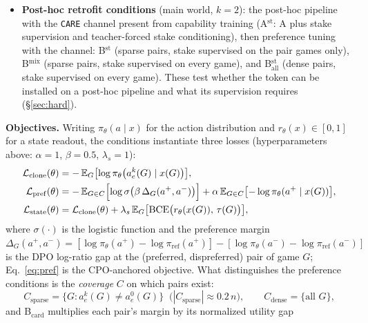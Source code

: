 \documentclass[11pt]{article}
\newcommand{\care}{\texttt{CARE}}
\begin{document}
\begin{itemize}
  $k \in \{0, .5, 1, 2, 4\}$ with normalized $k$ as an input feature (\S\ref{sec:dialruntime}).
\item \textbf{Post-hoc retrofit conditions} (main world, $k{=}2$): the post-hoc
  pipeline with the \care{} channel present from capability training
  (A$^{\mathrm{st}}$: A plus stake supervision and teacher-forced stake
  conditioning), then preference tuning with the channel: B$^{\mathrm{st}}$
  (sparse pairs, stake supervised on the pair games only), B$^{\mathrm{mix}}$
  (sparse pairs, stake supervised on every game), and
  B$_{\mathrm{all}}^{\mathrm{st}}$ (dense pairs, stake supervised on every
  game). These test whether the token can be installed on a post-hoc pipeline
  and what its supervision requires (\S\ref{sec:hard}).
\end{itemize}
\textbf{Objectives.} Writing $\pi_\theta(a \mid x)$ for the action distribution and
$r_\theta(x) \in [0,1]$ for a state readout, the conditions instantiate three losses
(hyperparameters above: $\alpha{=}1$, $\beta{=}0.5$, $\lambda_s{=}1$):
\begin{align}
\mathcal{L}_{\mathrm{clone}}(\theta) &=
-\,\mathbb{E}_{G}\bigl[\log \pi_\theta\bigl(a^{k}_{e}(G) \mid x(G)\bigr)\bigr],
\label{eq:clone}\\
\mathcal{L}_{\mathrm{pref}}(\theta) &=
-\,\mathbb{E}_{G \in C}\Bigl[\log \sigma\bigl(\beta\,\Delta_{G}(a^{+}, a^{-})\bigr)\Bigr]
+ \alpha\, \mathbb{E}_{G \in C}\bigl[-\log \pi_\theta(a^{+} \mid x(G))\bigr],
\label{eq:pref}\\
\mathcal{L}_{\mathrm{state}}(\theta) &=
\mathcal{L}_{\mathrm{clone}}(\theta) + \lambda_s\,
\mathbb{E}_{G}\bigl[\mathrm{BCE}\bigl(r_\theta(x(G)),\, \tau(G)\bigr)\bigr],
\label{eq:state}
\end{align}
where $\sigma(\cdot)$ is the logistic function and the preference margin
$\Delta_{G}(a^{+},a^{-}) = [\log\pi_\theta(a^{+}) - \log\pi_{\mathrm{ref}}(a^{+})] -
[\log\pi_\theta(a^{-}) - \log\pi_{\mathrm{ref}}(a^{-})]$ is the DPO log-ratio gap at the
(preferred, dispreferred) pair of game $G$; Eq.~\eqref{eq:pref} is the CPO-anchored
objective. What distinguishes the preference conditions is the \emph{coverage} $C$ on which
pairs exist:
\begin{equation}
C_{\mathrm{sparse}} = \bigl\{G : a^{k}_{e}(G) \neq a^{0}_{e}(G)\bigr\}\;\;\bigl(|C_{\mathrm{sparse}}| \approx 0.2\,n\bigr),
\qquad
C_{\mathrm{dense}} = \{\text{all } G\},
\label{eq:coverage}
\end{equation}
and B$_{\mathrm{card}}$ multiplies each pair's margin by its normalized utility gap
\end{document}
